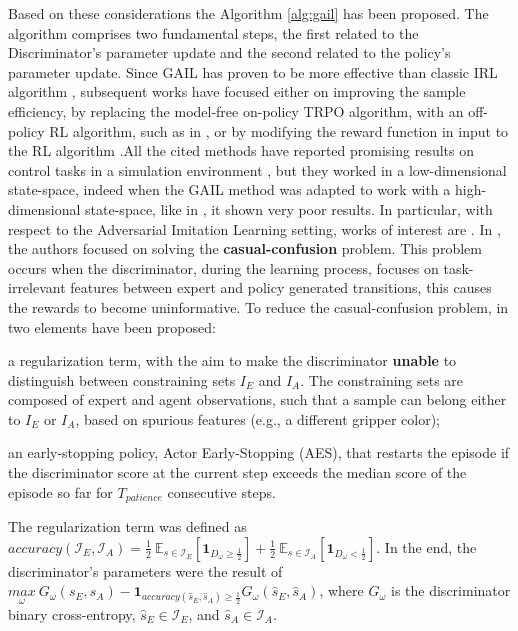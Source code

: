 Based on these considerations the Algorithm \ref{alg:gail} has been proposed. The algorithm comprises two fundamental steps, the first related to the Discriminator's parameter update and the second related to the policy's parameter update. Since GAIL has proven to be more effective than classic IRL algorithm \cite{ziebart2008maximum_entropy}, subsequent works have focused either on improving the sample efficiency, by replacing the model-free on-policy TRPO algorithm, with an off-policy RL algorithm, such as in \cite{kostrikov2018discriminator}, or by modifying the reward function in input to the RL algorithm \cite{fu2018airl,ghasemipour2020divergence_minimization_perspective}.All the cited methods have reported promising results on control tasks in a simulation environment \cite{brockman2016openai}, but they worked in a low-dimensional state-space, indeed when the GAIL method was adapted to work with a high-dimensional state-space, like in \cite{liu2018imitation_from_observation,reddy2019sqil,zolna2021task_relevant_ail,rafailov2021visual_ail}, it shown very poor results. In particular, with respect to the Adversarial Imitation Learning setting, works of interest are \cite{zolna2021task_relevant_ail,rafailov2021visual_ail}. In \cite{zolna2021task_relevant_ail}, the authors focused on solving the \textbf{casual-confusion} problem. This problem occurs when the discriminator, during the learning process, focuses on task-irrelevant features between expert and policy generated transitions, this causes the rewards to become uninformative. To reduce the casual-confusion problem, in \cite{zolna2021task_relevant_ail} two elements have been proposed: \begin{enumerate*}[label=(\textbf{\arabic*})]
    \item a regularization term, with the aim to make the discriminator \textbf{unable} to distinguish between constraining sets $I_{E}$ and $I_{A}$. The constraining sets are composed of expert and agent observations, such that a sample can belong either to $I_{E}$ or $I_{A}$, based on spurious features (e.g., a different gripper color);
    \item an early-stopping policy, Actor Early-Stopping (AES), that restarts the episode if the discriminator score at the current step exceeds the median score of the episode so far for $T_{patience}$ consecutive steps.
\end{enumerate*} The regularization term was defined as $\textit{accuracy}(\mathcal{I}_{E}, \mathcal{I}_{A}) = \frac{1}{2} \ \mathbb{E}_{s \in \mathcal{I}_{E}} \left[ \mathbf{1}_{D_{\omega} \geq  \frac{1}{2}}\right] + \frac{1}{2} \ \mathbb{E}_{s \in \mathcal{I}_{A}} \left[ \mathbf{1}_{D_{\omega} <  \frac{1}{2}}\right]$. In the end, the discriminator's parameters were the result of $\underset{\omega}{max} \ G_{\omega}(s_{E},s_{A}) - \mathbf{1}_{\textit{accuracy}(\hat{s}_{E},\hat{s}_{A}) \geq \frac{1}{2}} G_{\omega}(\hat{s}_{E},\hat{s}_{A})$, where $G_{\omega}$ is the discriminator binary cross-entropy, $\hat{s}_{E} \in \mathcal{I}_{E}$, and $\hat{s}_{A} \in \mathcal{I}_{A}$. %

